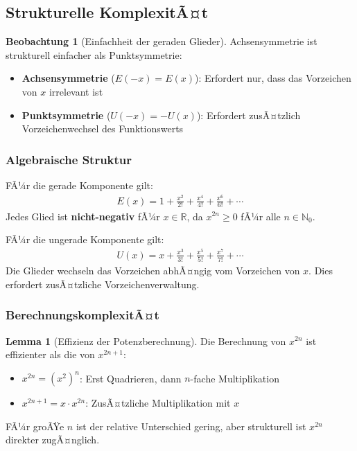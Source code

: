 ﻿\documentclass[a4paper,12pt]{article}
\theoremstyle{definition}
\newtheorem{lemma}{Lemma}
\newtheorem{beobachtung}{Beobachtung}
\begin{document}
\subsection{Strukturelle KomplexitÃ¤t}

\begin{beobachtung}[Einfachheit der geraden Glieder]
Achsensymmetrie ist strukturell einfacher als Punktsymmetrie:
\begin{itemize}
  \item[-] \textbf{Achsensymmetrie} ($E(-x) = E(x)$): Erfordert nur, dass das
           Vorzeichen von $x$ irrelevant ist
  \item[-] \textbf{Punktsymmetrie} ($U(-x) = -U(x)$): Erfordert zusÃ¤tzlich
           Vorzeichenwechsel des Funktionswerts
\end{itemize}
\end{beobachtung}

\subsubsection{Algebraische Struktur}

FÃ¼r die gerade Komponente gilt:
\begin{align}
  E(x) = 1 + \frac{x^2}{2!} + \frac{x^4}{4!} + \frac{x^6}{6!} + \cdots
\end{align}
Jedes Glied ist \textbf{nicht-negativ} fÃ¼r $x \in \mathbb{R}$, da
$x^{2n} \geq 0$ fÃ¼r alle $n \in \mathbb{N}_0$.

FÃ¼r die ungerade Komponente gilt:
\begin{align}
  U(x) = x + \frac{x^3}{3!} + \frac{x^5}{5!} + \frac{x^7}{7!} + \cdots
\end{align}
Die Glieder wechseln das Vorzeichen abhÃ¤ngig vom Vorzeichen von $x$.
Dies erfordert zusÃ¤tzliche Vorzeichenverwaltung.

\subsubsection{BerechnungskomplexitÃ¤t}

\begin{lemma}[Effizienz der Potenzberechnung]
Die Berechnung von $x^{2n}$ ist effizienter als die von $x^{2n+1}$:
\begin{itemize}
  \item[-] $x^{2n} = (x^2)^n$: Erst Quadrieren, dann $n$-fache Multiplikation
  \item[-] $x^{2n+1} = x \cdot x^{2n}$: ZusÃ¤tzliche Multiplikation mit $x$
\end{itemize}
FÃ¼r groÃŸe $n$ ist der relative Unterschied gering, aber strukturell ist
$x^{2n}$ direkter zugÃ¤nglich.
\end{lemma}
\end{document}
